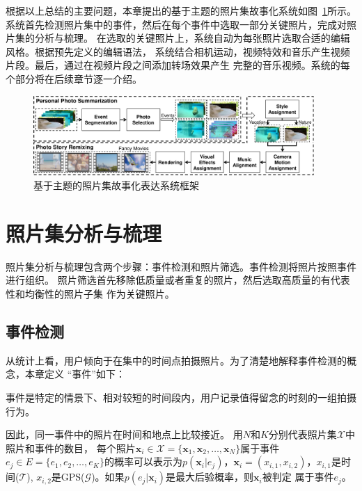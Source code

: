 \documentclass[doctor]{ustcthesis}
\def \x {\mathbf{x}}
\def \X {\mathcal{X}}
\begin{document}
根据以上总结的主要问题，本章提出的基于主题的照片集故事化系统如图~\ref{fig:monet-framework}所示。
系统首先检测照片集中的事件，然后在每个事件中选取一部分关键照片，完成对照片集的分析与梳理。
在选取的关键照片上，系统自动为每张照片选取合适的编辑风格。根据预先定义的编辑语法，
系统结合相机运动，视频特效和音乐产生视频片段。最后，通过在视频片段之间添加转场效果产生
完整的音乐视频。系统的每个部分将在后续章节逐一介绍。
\begin{figure}[t]
    \center
    \includegraphics[clip=true, width=0.95\textwidth]{monet-framework.pdf}
    \caption{基于主题的照片集故事化表达系统框架}
    \label{fig:monet-framework}
    \vspace{-2em}
\end{figure}

\section{照片集分析与梳理}
照片集分析与梳理包含两个步骤：事件检测和照片筛选。事件检测将照片按照事件进行组织。
照片筛选首先移除低质量或者重复的照片，然后选取高质量的有代表性和均衡性的照片子集
作为关键照片。

\subsection{事件检测}
从统计上看，用户倾向于在集中的时间点拍摄照片。为了清楚地解释事件检测的概念，本章定义
``事件''如下：
\begin{definition}[\textbf{事件}]
    事件是特定的情景下、相对较短的时间段内，用户记录值得留念的时刻的一组拍摄行为。
\end{definition}

因此，同一事件中的照片在时间和地点上比较接近。
用$N$和$K$分别代表照片集$\X$中照片和事件的数目，
每个照片$\x_i \in \X = \{\x_1, \x_2, \ldots, \x_N\}$属于事件$e_j \in E = \{e_1, e_2, \ldots,
e_K\}$的概率可以表示为$p(\x_i|e_j)$，$\x_i=(x_{i,1},
x_{i,2})$，$x_{i,1}$是时间($\mathcal{T}$),
$x_{i,2}$是GPS($\mathcal{G}$)。如果$p(e_j|\x_i)$是最大后验概率，则$\x_i$被判定
属于事件$e_j$。
\end{document}

